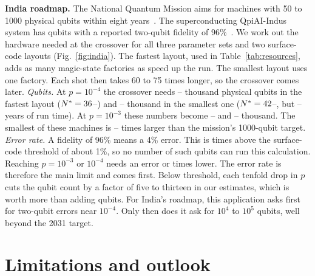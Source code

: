 \documentclass[conference]{IEEEtran}
\begin{document}
\textbf{India roadmap.} The National Quantum Mission aims for machines with
50 to 1000 physical qubits within eight years~\cite{nqm2023}. The
superconducting QpiAI-Indus system has \indiaQpiaiQubits{} qubits with a
reported two-qubit fidelity of 96\%~\cite{qpiai2025}. We work out the
hardware needed at the crossover for all three parameter sets and two
surface-code layouts (Fig.~\ref{fig:india}). The fastest layout, used in
Table~\ref{tab:resources}, adds as many magic-state factories as speed up
the run. The smallest layout uses one factory. Each shot then takes 60 to
75 times longer, so the crossover comes later. \emph{Qubits.} At
$p=10^{-4}$ the crossover needs \indiaFastQloB--\indiaFastQhiB{} thousand
physical qubits in the fastest layout ($N^*=36$--\indiaFastNhiB)
and \indiaMinQloB--\indiaMinQhiB{} thousand in the smallest one
($N^*=42$--\indiaMinNhiB, but \indiaMinTloB--\indiaMinThiB{}
years of run time). At $p=10^{-3}$ these numbers become
\indiaFastQloA--\indiaFastQhiA{} and \indiaMinQloA--\indiaMinQhiA{}
thousand. The smallest of these machines is
\indiaMinGapNQMloB--\indiaMinGapNQMhiB{} times larger than the mission's
1000-qubit target. \emph{Error rate.} A
fidelity of 96\% means a 4\% error. This is \indiaQpiaiOverThreshold{} times
above the surface-code threshold of about 1\%, so no number of such qubits
can run this calculation. Reaching $p=10^{-3}$ or $10^{-4}$ needs an error
\indiaErrGapA{} or \indiaErrGapB{} times lower. The error rate is therefore
the main limit and comes first. Below threshold, each tenfold drop in $p$
cuts the qubit count by a factor of five to thirteen in our estimates,
which is worth more than adding qubits. For India's roadmap,
this application asks first for two-qubit errors near $10^{-4}$. Only then
does it ask for $10^4$ to $10^5$ qubits, well beyond the 2031 target.

\section{Limitations and outlook}
\end{document}
